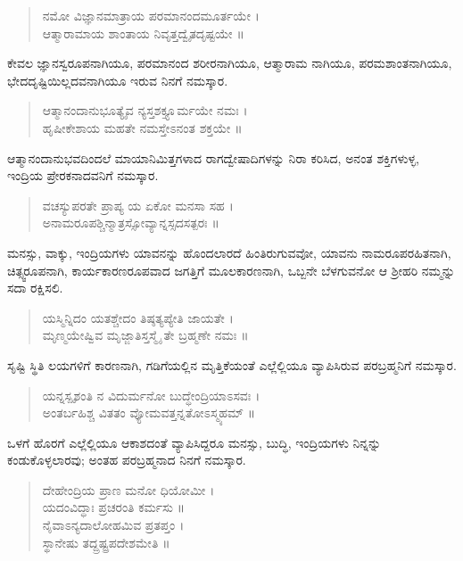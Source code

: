 \begin{verse}
ನಮೋ ವಿಜ್ಞಾನಮಾತ್ರಾಯ ಪರಮಾನಂದಮೂರ್ತಯೇ ।\\ಆತ್ಮಾರಾಮಾಯ ಶಾಂತಾಯ ನಿವೃತ್ತದ್ವೈತದೃಷ್ಟಯೇ ॥
\end{verse}

ಕೇವಲ ಜ್ಞಾನಸ್ವರೂಪನಾಗಿಯೂ, ಪರಮಾನಂದ ಶರೀರನಾಗಿಯೂ, ಆತ್ಮಾರಾಮ ನಾಗಿಯೂ, ಪರಮಶಾಂತನಾಗಿಯೂ, ಭೇದದೃಷ್ಟಿಯಿಲ್ಲದವನಾಗಿಯೂ ಇರುವ ನಿನಗೆ ನಮಸ್ಕಾರ.

\begin{verse}
ಆತ್ಮಾನಂದಾನುಭೂತ್ಯೈವ ನ್ಯಸ್ತಶಕ್ತ್ಯೂರ್ಮಯೇ ನಮಃ ।\\ಹೃಷೀಕೇಶಾಯ ಮಹತೇ ನಮಸ್ತೇಽನಂತ ಶಕ್ತಯೇ ॥
\end{verse}

ಆತ್ಮಾನಂದಾನುಭವದಿಂದಲೆ ಮಾಯಾನಿಮಿತ್ತಗಳಾದ ರಾಗದ್ವೇಷಾದಿಗಳನ್ನು ನಿರಾ ಕರಿಸಿದ, ಅನಂತ ಶಕ್ತಿಗಳುಳ್ಳ, ಇಂದ್ರಿಯ ಪ್ರೇರಕನಾದವನಿಗೆ ನಮಸ್ಕಾರ.

\begin{verse}
ವಚಸ್ಯುಪರತೇ ಪ್ರಾಪ್ಯ ಯ ಏಕೋ ಮನಸಾ ಸಹ ।\\ಅನಾಮರೂಪಶ್ಚಿನ್ಮಾತ್ರಸ್ಸೋವ್ಯಾನ್ನಸ್ಸದಸತ್ಪರಃ ॥
\end{verse}

ಮನಸ್ಸು, ವಾಕ್ಕು, ಇಂದ್ರಿಯಗಳು ಯಾವನನ್ನು ಹೊಂದಲಾರದೆ ಹಿಂತಿರುಗುವವೋ, ಯಾವನು ನಾಮರೂಪರಹಿತನಾಗಿ, ಚಿತ್ಸ್ವರೂಪನಾಗಿ, ಕಾರ್ಯಕಾರಣರೂಪವಾದ ಜಗತ್ತಿಗೆ ಮೂಲಕಾರಣನಾಗಿ, ಒಬ್ಬನೇ ಬೆಳಗುವನೋ ಆ ಶ್ರೀಹರಿ ನಮ್ಮನ್ನು ಸದಾ ರಕ್ಷಿಸಲಿ.

\begin{verse}
ಯಸ್ಮಿನ್ನಿದಂ ಯತಶ್ಚೇದಂ ತಿಷ್ಠತ್ಯಪ್ಯೇತಿ ಜಾಯತೇ ।\\ಮೃಣ್ಮಯೇಷ್ವಿವ ಮೃಜ್ಜಾತಿಸ್ತಸ್ಮೈ ತೇ ಬ್ರಹ್ಮಣೇ ನಮಃ ॥
\end{verse}

ಸೃಷ್ಟಿ ಸ್ಥಿತಿ ಲಯಗಳಿಗೆ ಕಾರಣನಾಗಿ, ಗಡಿಗೆಯಲ್ಲಿನ ಮೃತ್ತಿಕೆಯಂತೆ ಎಲ್ಲೆಲ್ಲಿಯೂ ವ್ಯಾಪಿಸಿರುವ ಪರಬ್ರಹ್ಮನಿಗೆ ನಮಸ್ಕಾರ.

\begin{verse}
ಯನ್ನಸ್ಪೃಶಂತಿ ನ ವಿದುರ್ಮನೋ ಬುದ್ಧೇಂದ್ರಿಯಾಽಸವಃ ।\\ಅಂತರ್ಬಹಿಶ್ಚ ವಿತತಂ ವ್ಯೋಮವತ್ತನ್ನತೋಽಸ್ಮ್ಯಹಮ್ ॥
\end{verse}

ಒಳಗೆ ಹೊರಗೆ ಎಲ್ಲೆಲ್ಲಿಯೂ ಆಕಾಶದಂತೆ ವ್ಯಾಪಿಸಿದ್ದರೂ ಮನಸ್ಸು, ಬುದ್ಧಿ, ಇಂದ್ರಿಯಗಳು ನಿನ್ನನ್ನು ಕಂಡುಕೊಳ್ಳಲಾರವು; ಅಂತಹ ಪರಬ್ರಹ್ಮನಾದ ನಿನಗೆ ನಮಸ್ಕಾರ.

\begin{verse}
ದೇಹೇಂದ್ರಿಯ ಪ್ರಾಣ ಮನೋ ಧಿಯೋಮೀ ।\\ಯದಂವಿದ್ಧಾಃ ಪ್ರಚರಂತಿ ಕರ್ಮಸು ॥\\ನೈವಾಽನ್ಯದಾಲೋಹಮಿವ ಪ್ರತಪ್ತಂ ।\\ಸ್ಥಾನೇಷು ತದ್ದ್ರಷ್ಟ್ರಪದೇಶಮೇತಿ ॥
\end{verse}

